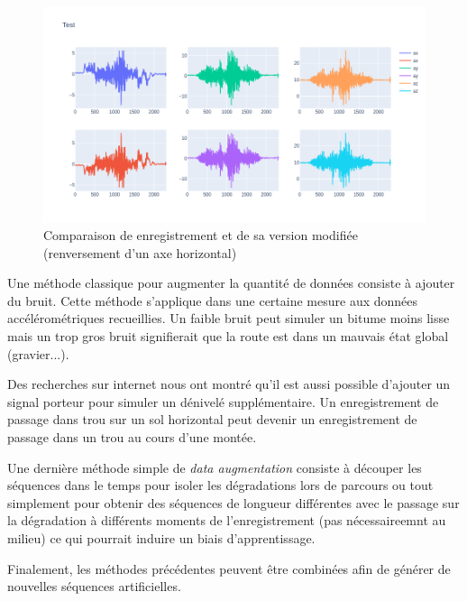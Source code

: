 \begin{figure}
    \center
    \includegraphics[scale=0.5]{img/inverted_data.png}
    \caption{Comparaison de enregistrement et de sa version modifiée (renversement d'un axe horizontal)}
    \label{data_augmentation_2}
\end{figure}

Une méthode classique pour augmenter la quantité de données consiste à ajouter du bruit. Cette méthode s'applique dans une certaine mesure aux données accélérométriques recueillies. Un faible bruit peut simuler un bitume moins lisse mais un trop gros bruit signifierait que la route est dans un mauvais état global (gravier...).

Des recherches sur internet \cite{TerryUm_ICMI2017} nous ont montré qu'il est aussi possible d'ajouter un signal porteur pour simuler un dénivelé supplémentaire. Un enregistrement de passage dans trou sur un sol horizontal peut devenir un enregistrement de passage dans un trou au cours d'une montée.

Une dernière méthode simple de \textit{data augmentation} consiste à découper les séquences dans le temps pour isoler les dégradations lors de parcours ou tout simplement pour obtenir des séquences de longueur différentes avec le passage sur la dégradation à différents moments de l'enregistrement (pas nécessaireemnt au milieu) ce qui pourrait induire un biais d'apprentissage.

Finalement, les méthodes précédentes peuvent être combinées afin de générer de nouvelles séquences artificielles.